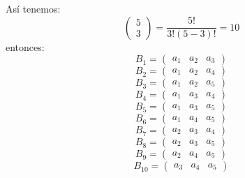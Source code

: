 \begin{itemize}
        Así tenemos: 
        $$\begin{pmatrix}5\\ 3\end{pmatrix}= \frac{5!}{3!\left(5-3\right)!}=10$$
        entonces:
        $$B_1=\begin{pmatrix}a_1&a_2&a_3\end{pmatrix}$$
        $$B_2=\begin{pmatrix}a_1&a_2&a_4\end{pmatrix}$$
        $$B_3=\begin{pmatrix}a_1&a_2&a_5\end{pmatrix}$$
        $$B_4=\begin{pmatrix}a_1&a_3&a_4\end{pmatrix}$$
        $$B_5=\begin{pmatrix}a_1&a_3&a_5\end{pmatrix}$$
        $$B_6=\begin{pmatrix}a_1&a_4&a_5\end{pmatrix}$$
        $$B_7=\begin{pmatrix}a_2&a_3&a_4\end{pmatrix}$$
        $$B_8=\begin{pmatrix}a_2&a_3&a_5\end{pmatrix}$$
        $$B_9=\begin{pmatrix}a_2&a_4&a_5\end{pmatrix}$$
        $$B_{10}=\begin{pmatrix}a_3&a_4&a_5\end{pmatrix}$$
        

\end{itemize}
